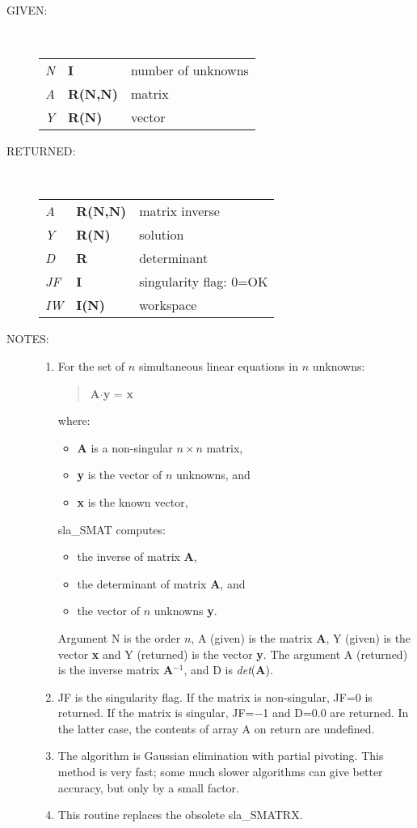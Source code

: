 \documentclass[11pt,twoside]{article}
\newlength{\oldspacing}
\newcommand{\args}[2]
{
  \goodbreak
  \setlength{\oldspacing}{\topsep}
  \setlength{\topsep}{0.3ex}
  \begin{description}
  \item[#1]:\\[1.5ex]
    \begin{tabular}{p{7em}p{6em}p{22em}}
      #2
    \end{tabular}
  \end{description}
  \setlength{\topsep}{\oldspacing}
}
\renewcommand{\args}[2]
   {
     \begin{description}
        \item[#1:]\\
        \begin{tabular}{p{7em}p{6em}l}
           #2
        \end{tabular}
     \end{description}
   }
\newcommand{\spec}[3]
{
  {\em {#1}} & {\bf \mbox{#2}} & {#3}
}
\newcommand{\notes}[1]
{
  \goodbreak
  \setlength{\oldspacing}{\topsep}
  \setlength{\topsep}{0.3ex}
  \begin{description}
    \item[NOTES]:
        #1
  \end{description}
  \setlength{\topsep}{\oldspacing}
}
\renewcommand{\notes}[1]
   {
      \begin{description}
         \item[NOTES:]
            #1
      \end{description}
   }
\begin{document}
\args{GIVEN}
{
 \spec{N}{I}{number of unknowns} \\
 \spec{A}{R(N,N)}{matrix} \\
 \spec{Y}{R(N)}{vector}
}
\args{RETURNED}
{
 \spec{A}{R(N,N)}{matrix inverse} \\
 \spec{Y}{R(N)}{solution} \\
 \spec{D}{R}{determinant} \\
 \spec{JF}{I}{singularity flag: 0=OK} \\
 \spec{IW}{I(N)}{workspace}
}
\notes
{
 \begin{enumerate}
  \item For the set of $n$ simultaneous linear equations in $n$ unknowns:
        \begin{verse}
         {\bf A}$\cdot${\bf y} = {\bf x}
        \end{verse}
        where:
        \begin{itemize}
         \item {\bf A} is a non-singular $n \times n$ matrix,
         \item {\bf y} is the vector of $n$ unknowns, and
         \item {\bf x} is the known vector,
        \end{itemize}
        sla\_SMAT computes:
        \begin{itemize}
         \item the inverse of matrix {\bf A},
         \item the determinant of matrix {\bf A}, and
         \item the vector of $n$ unknowns {\bf y}.
        \end{itemize}
        Argument N is the order $n$, A (given) is the matrix {\bf A},
        Y (given) is the vector {\bf x} and Y (returned)
        is the vector {\bf y}.
        The argument A (returned) is the inverse matrix {\bf A}$^{-1}$,
        and D is {\it det}\/({\bf A}).
  \item JF is the singularity flag.  If the matrix is non-singular,
        JF=0 is returned.  If the matrix is singular, JF=$-$1
        and D=0.0 are returned.  In the latter case, the contents
        of array A on return are undefined.
  \item The algorithm is Gaussian elimination with partial pivoting.
        This method is very fast;  some much slower algorithms can give
        better accuracy, but only by a small factor.
  \item This routine replaces the obsolete sla\_SMATRX.
 \end{enumerate}
}
\end{document}

